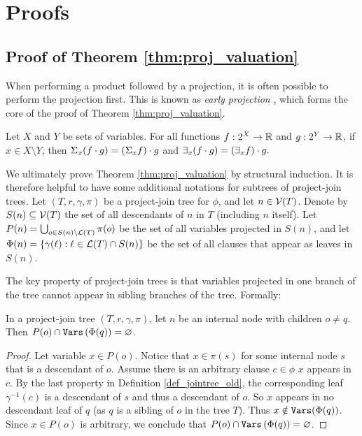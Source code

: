 



\section{Proofs}
\label{appendix:proofs}

\subsection{Proof of Theorem \ref{thm:proj_valuation}}
When performing a product followed by a projection, it is often possible to perform the projection first.
This is known as \emph{early projection} \cite{MPPV04}, which forms the core of the proof of Theorem \ref{thm:proj_valuation}.
\begin{theorem}
\label{thm:early_projection}
    Let $X$ and $Y$ be sets of variables.
    For all functions $f: 2^X \to \mathbb{R}$ and $g: 2^Y \to \mathbb{R}$, if $x \in X \setminus Y$, then $\Sigma_x (f \cdot g) = \left( \Sigma_x f \right) \cdot g$ and $\exists_x (f \cdot g) = \left( \exists_x f \right) \cdot g.$
\end{theorem}

We ultimately prove Theorem \ref{thm:proj_valuation} by structural induction. 
It is therefore helpful to have some additional notations for subtrees of project-join trees.
Let $(T, r, \gamma, \pi)$ be a project-join tree for $\phi$, and let $n \in \mathcal{V}(T)$. Denote by $S(n) \subseteq \mathcal{V}(T)$ the set of all descendants of $n$ in $T$ (including $n$ itself). 
Let $P(n) = \bigcup_{o \in S(n) \setminus \mathcal{L}(T)} \pi(o)$ be the set of all variables projected in $S(n)$, and let $\Phi(n) = \{ \gamma(\ell) : \ell \in \mathcal{L}(T) \cap S(n) \}$ be the set of all clauses that appear as leaves in $S(n)$.

The key property of project-join trees is that variables projected in one branch of the tree cannot appear in sibling branches of the tree. Formally:
\begin{lemma}
\label{lemma:disjoint_P}
    In a project-join tree $(T, r, \gamma, \pi)$, let $n$ be an internal node with children $o \ne q$.
    Then $P(o) \cap \texttt{\upshape Vars} \left( \Phi(q) \right) = \varnothing$.
\end{lemma}
\begin{proof}
    Let variable $x \in P(o)$.
    Notice that $x \in \pi(s)$ for some internal node $s$ that is a descendant of $o$.
    Assume there is an arbitrary clause $c \in \phi$ \st{} $x$ appears in $c$.
    By the last property in Definition \ref{def_jointree_old}, the corresponding leaf $\gamma^{-1}(c)$ is a descendant of $s$ and thus a descendant of $o$.
    So $x$ appears in no descendant leaf of $q$ (as $q$ is a sibling of $o$ in the tree $T$).
    Thus $x \notin \texttt{\upshape Vars}(\Phi(q))$. Since $x \in P(o)$ is arbitrary, we conclude that $P(o) \cap \texttt{\upshape Vars} \left( \Phi(q) \right) = \varnothing$.
\end{proof}

